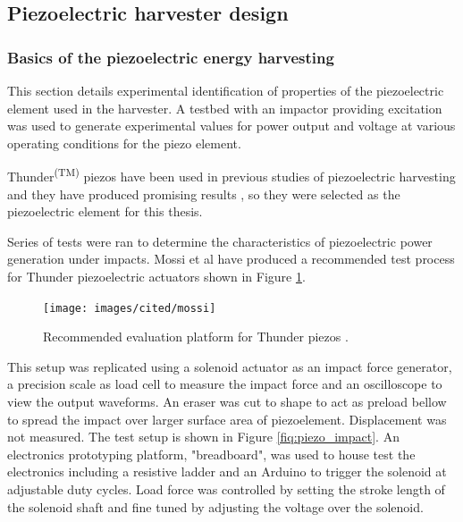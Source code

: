 \subsection{Piezoelectric harvester design}
\subsubsection{Basics of the piezoelectric energy harvesting }
This section details experimental identification of properties of the piezoelectric element used in the harvester. A testbed with an impactor providing excitation was used to generate experimental values for power output and voltage at various operating conditions for the piezo element.

Thunder\textsuperscript{(TM)} piezos have been used in previous studies of piezoelectric harvesting and they have produced promising results \cite{Manla2009}, so they were selected as the piezoelectric element for this thesis.

Series of tests were ran to determine the characteristics of piezoelectric power generation under impacts. Mossi et al \cite{Mossi} have produced a recommended test process for Thunder piezoelectric actuators shown in Figure \ref{fiq:thunder_eval}.

\begin{figure}[htb]
  \begin{center}
  \texttt{[image: images/cited/mossi]}
  \end{center}
  \caption{Recommended evaluation platform for Thunder piezos \cite{Mossi}.}
  \label{fiq:thunder_eval}
\end{figure}

This setup was replicated using a solenoid actuator as an impact force generator, a precision scale as load cell to measure the impact force and an oscilloscope to view the output waveforms. An eraser was cut to shape to act as preload bellow to spread the impact over larger surface area of piezoelement. Displacement was not measured. The test setup is shown in Figure \ref{fiq:piezo_impact}. An electronics prototyping platform, "breadboard", was used to house test the electronics including a resistive ladder and an Arduino to trigger the solenoid at adjustable duty cycles. Load force was controlled by setting the stroke length of the solenoid shaft and fine tuned by adjusting the voltage over the solenoid. 

